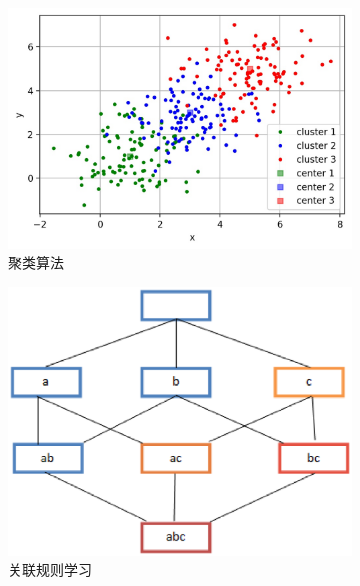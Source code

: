 \begin{figure}[htp]
	 \medskip
	 \begin{subfigure}{.33\textwidth}
	   \centering
	   \includegraphics[width=\linewidth]{ch02/img/ch2/2.1/7.jpg}
	   \caption{聚类算法}
	   \label{fig:2.sub.7}
	 \end{subfigure}\hfil
	 \begin{subfigure}{.33\textwidth}
	   \centering
	   \includegraphics[width=\linewidth]{eps/2.2.8.eps}
	   \caption{关联规则学习}
	   \label{fig:2.sub.8}
	 \end{subfigure}\hfil
	 \begin{subfigure}{.33\textwidth}
	   \centering

\end{subfigure}
\end{figure}
